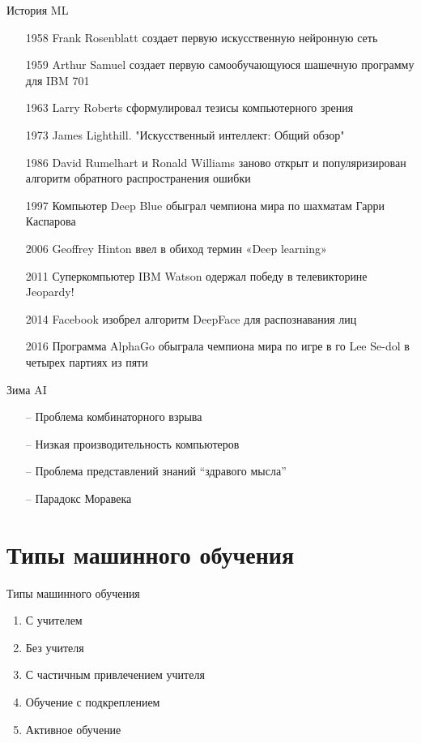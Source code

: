 \documentclass[10pt]{beamer}
\begin{document}
\begin{frame}{История ML}
	\begin{itemize} [<+->]
	  \item[1958] Frank Rosenblatt создает первую искусственную нейронную сеть
	  \item[1959] Arthur Samuel создает первую самообучающуюся шашечную программу для IBM 701
	  \item[1963] Larry Roberts сформулировал тезисы компьютерного зрения
	  \item[1973] James Lighthill. "Искусственный интеллект: Общий обзор"
	  \item[1986] David Rumelhart и Ronald Williams заново открыт и популяризирован алгоритм обратного распространения ошибки
	  \item[1997] Компьютер Deep Blue обыграл чемпиона мира по шахматам Гарри Каспарова
	  \item[2006] Geoffrey Hinton ввел в обиход термин «Deep learning» 
	  \item[2011] Суперкомпьютер IBM Watson одержал победу в телевикторине Jeopardy!
	  \item[2014] Facebook изобрел алгоритм DeepFace для распознавания лиц
	  \item[2016] Программа AlphaGo обыграла чемпиона мира по игре в го Lee Se-dol в четырех партиях из пяти
	\end{itemize}
\end{frame}

{
\begin{frame}{Зима AI}
	\begin{itemize} [<+->]
	  \item[--] Проблема комбинаторного взрыва
	  \item[--] Низкая производительность компьютеров
	  \item[--] Проблема представлений знаний “здравого мысла”
	  \item[--] Парадокс Моравека
	\end{itemize}
\end{frame}
}

\section{Типы машинного обучения}

\begin{frame}{Типы машинного обучения}
	\begin{enumerate}
	  \item С учителем
	  \item Без учителя
	  \item С частичным привлечением учителя
	  \item Обучение с подкреплением
	  \item Активное обучение
	\end{enumerate}
\end{frame}
\end{document}

